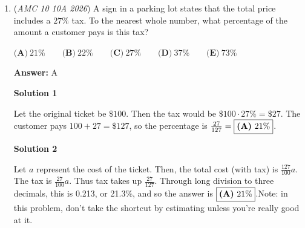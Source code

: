 \begin{enumerate}
 



\textbf{Solution 5 (Sentence-long)}

33 LP records are like 99 EP records, and with 45 EP records, we subtract $99-45 = \boxed{54}$.

 Note: This is basically solution $2$, except it's a sentence.

 



\textbf{Solution 6 (Calculus)}

Let $t>0$ be the playing time of one EP. Then the total playing time of Helena's LPs is $33(3t)=99t$.

 For real $x\geq 0$, define
 \[f(x)=(45+x)t-99t.\]For integer $x$, this is the total EP playing time minus the total LP playing time after Helena adds $x$ EPs. Thus we seek an integer $x$ for which $f(x)=0$.

 Since $f(0)=-54t$ and $f'(x)=t$, the Fundamental Theorem of Calculus gives
 \[0=f(x)=f(0)+\int_0^x f'(u)\,du=-54t+\int_0^x t\,du=-54t+xt.\]Dividing by $t$ gives $x=54$, so Helena needs $\boxed{\textbf{(B) }54}$ additional EPs.

 Note: the problem where this is linked is covered 0:10-0:55

 


	\item (\textit{AMC 10 10A 2026}) A sign in a parking lot states that the total price includes a $27\%$ tax. To the nearest whole number, what percentage of the amount a customer pays is this tax?


 $\textbf{(A)}\ 21\% \qquad \textbf{(B)}\ 22\% \qquad \textbf{(C)}\ 27\% \qquad \textbf{(D)}\ 37\% \qquad \textbf{(E)}\ 73\%$

 \textbf{Answer: }A



\textbf{Solution 1}

Let the original ticket be $\$100$. Then the tax would be $\$100 \cdot 27\% = \$27$. The customer pays $100+27=\$127$, so the percentage is $\frac{27}{127}=\fbox{\textbf{(A)}\ 21\%}$.

 



\textbf{Solution 2}

Let $a$ represent the cost of the ticket. Then, the total cost (with tax) is $\frac{127}{100} a$. The tax is $\frac{27}{100}a$. Thus tax takes up $\frac{27}{127}$. Through long division to three decimals, this is 0.213, or 21.3\%, and so the answer is $\fbox{\textbf{(A)}\ 21\%}$.Note: in this problem, don't take the shortcut by estimating unless you're really good at it.


\end{enumerate}
